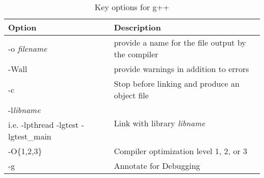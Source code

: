 \documentclass[]{tufte-handout}
\begin{document}
\begin{table*}
\begin{tabular}{ll}
\hline Option & Description \\ \hline \hline
-o \textit{filename} & provide a name for the file output by the compiler \\ 
-Wall & provide warnings in addition to errors \\ 
-c &  Stop before linking and produce an object file \\ 
-l\textit{libname} & \multirow{2}{*}{Link with library \textit{libname}} \\ 
 i.e. -lpthread -lgtest -lgtest\_main & \\ 
-O\{1,2,3\} & Compiler optimization level 1, 2, or 3 \\ 
-g & Annotate for Debugging \\ \hline
\end{tabular}
\caption{Key options for g++}
\label{tab:g++Opts}
\end{table*}
\end{document}

